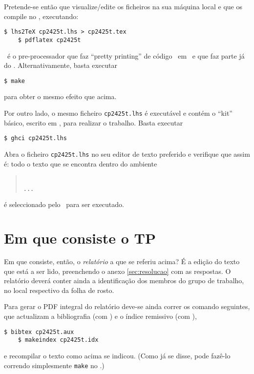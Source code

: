 \documentclass[11pt, a4paper, fleqn]{article}
\begin{document}
Pretende-se então que visualize/edite os ficheiros na sua máquina local e que
os compile no \container, executando:
\begin{Verbatim}[fontsize=\small]
    $ lhs2TeX cp2425t.lhs > cp2425t.tex
    $ pdflatex cp2425t
\end{Verbatim}
\LhsToTeX\ é o pre-processador que faz ``pretty printing'' de código \Haskell\
em \Latex\ e que faz parte já do \container. Alternativamente, basta executar
\begin{Verbatim}[fontsize=\small]
    $ make
\end{Verbatim}
para obter o mesmo efeito que acima.

Por outro lado, o mesmo ficheiro \texttt{cp2425t.lhs} é executável e contém
o ``kit'' básico, escrito em \Haskell, para realizar o trabalho. Basta executar
\begin{Verbatim}[fontsize=\small]
    $ ghci cp2425t.lhs
\end{Verbatim}

\noindent Abra o ficheiro \texttt{cp2425t.lhs} no seu editor de texto preferido
e verifique que assim é: todo o texto que se encontra dentro do ambiente
\begin{quote}\small\tt
{}
\\ ... \\
\end{quote}
é seleccionado pelo \GHCi\ para ser executado.

\section{Em que consiste o TP}

Em que consiste, então, o \emph{relatório} a que se referiu acima?
É a edição do texto que está a ser lido, preenchendo o anexo \ref{sec:resolucao}
com as respostas. O relatório deverá conter ainda a identificação dos membros
do grupo de trabalho, no local respectivo da folha de rosto.

Para gerar o PDF integral do relatório deve-se ainda correr os comando seguintes,
que actualizam a bibliografia (com \Bibtex) e o índice remissivo (com \Makeindex),
\begin{Verbatim}[fontsize=\small]
    $ bibtex cp2425t.aux
    $ makeindex cp2425t.idx
\end{Verbatim}
e recompilar o texto como acima se indicou. (Como já se disse, pode fazê-lo
correndo simplesmente \texttt{make} no \container.)
\end{document}
